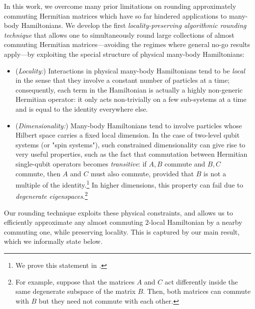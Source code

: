 \documentclass[a4paper,onecolumn,11pt]{quantumarticle}
\theoremstyle{plain}
\begin{document}
In this work, we overcome many prior limitations on rounding 
approximately commuting Hermitian matrices which have so far hindered 
applications to many-body Hamiltonians. We develop the first 
\emph{locality-preserving algorithmic rounding technique} that allows one to 
simultaneously
round large collections of almost commuting Hermitian matrices---avoiding the regimes where 
general no-go results apply---by exploiting the special structure of physical many-body Hamiltonians:
\begin{itemize}
\item (\emph{Locality:}) Interactions in physical many-body Hamiltonians tend 
to be \emph{local} in the sense that they involve a constant number of 
particles at a time; consequently, each term in the Hamiltonian is 
actually a 
highly non-generic Hermitian operator: it only acts non-trivially on a 
few sub-systems at a time and is equal to the identity everywhere else.

\item (\emph{Dimensionality:}) Many-body Hamiltonians tend to 
involve particles whose Hilbert space carries a fixed local dimension. 
In the case of two-level qubit systems (or "spin systems"), such constrained dimensionality can give rise to very useful properties, such as the fact that commutation between Hermitian single-qubit operators becomes 
\emph{transitive}: if $A,B$ commute and $B,C$ 
commute, then $A$ and $C$ must also commute, provided that $B$ is not 
a multiple of the identity.\footnote{We prove this statement in .} In higher dimensions, this property can fail due to \emph{degenerate eigenspaces}.\footnote{For example, suppose that the matrices $A$ and $C$ act differently inside the same degenerate subspace of the matrix $B$. Then, both matrices can commute with $B$ but they need not commute with each other.}
\end{itemize}




Our rounding technique exploits these physical constraints, 
and allows us to
efficiently approximate any almost commuting $2$-local 
Hamiltonian by a nearby commuting one, while preserving locality.
This is captured by our main 
result, which we informally state below.
\end{document}
